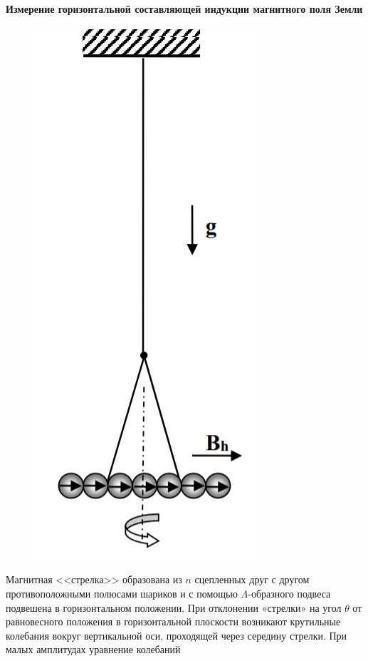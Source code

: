 \documentclass[a4paper,12pt]{article}
\begin{document}
\paragraph*{Измерение горизонтальной составляющей индукции магнитного поля Земли}
\begin{figure}
\includegraphics[scale=0.1]{1.png}
\vspace{-60pt}
\end{figure}  
Магнитная <<стрелка>> образована из $n$ сцепленных друг с другом противоположными полюсами шариков и с помощью $\Lambda$-образного подвеса подвешена в горизонтальном положении. При отклонении «стрелки» на угол $\theta$ от равновесного положения в горизонтальной плоскости возникают крутильные колебания вокруг вертикальной оси, проходящей через середину стрелки. При малых амплитудах уравнение колебаний
\end{document}
